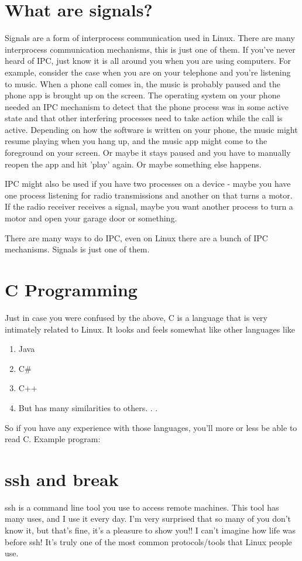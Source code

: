 \documentclass[12pt]{article}
\begin{document}
\section{What are signals?}
Signals are a form of interprocess communication used in Linux. There are many interprocess communication mechanisms, this is just one of them. If you've never heard of IPC, just know it is all around you when you are using computers. For example, consider the case when you are on your telephone and you're listening to music. When a phone call comes in, the music is probably paused and the phone app is brought up on the screen. The operating system on your phone needed an IPC mechanism to detect that the phone process was in some active state and that other interfering processes need to take action while the call is active. Depending on how the software is written on your phone, the music might resume playing when you hang up, and the music app might come to the foreground on your screen. Or maybe it stays paused and you have to manually reopen the app and hit 'play' again. Or maybe something else happens.

IPC might also be used if you have two processes on a device - maybe you have one process listening for radio transmissions and another on that turns a motor. If the radio receiver receives a signal, maybe you want another process to turn a motor and open your garage door or something.

There are many ways to do IPC, even on Linux there are a bunch of IPC mechanisms. Signals is just one of them.

\section{C Programming}
Just in case you were confused by the above, C is a language that is very intimately related to Linux. It looks and feels somewhat like other languages like 
\begin{enumerate}
\item Java
\item C\#
\item C++
\item But has many similarities to others. . .
\end{enumerate}

So if you have any experience with those languages, you'll more or less be able to read C.
Example program:



\section{ssh and break}
ssh is a command line tool you use to access remote machines. This tool has many uses, and I use it every day. I'm very surprised that so many of you don't know it, but that's fine, it's a pleasure to show you!! I can't imagine how life was before ssh! It's truly one of the most common protocols/tools that Linux people use. 
\end{document}
